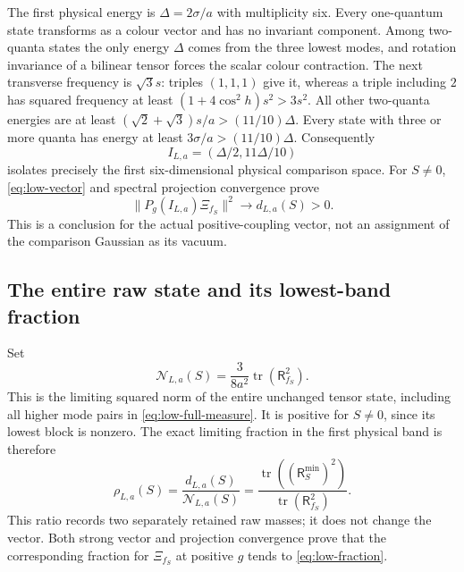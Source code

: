 The first physical energy is $\Delta=2\sigma/a$ with multiplicity six.
Every one-quantum state transforms as a colour vector and has no
invariant component. Among two-quanta states the only energy $\Delta$
comes from the three lowest modes, and rotation invariance of a
bilinear tensor forces the scalar colour contraction.
The next transverse frequency is $\sqrt3s$: triples $(1,1,1)$
give it, whereas a triple including $2$ has squared frequency at least
$(1+4\cos^2h)s^2>3s^2$.
All other two-quanta energies are at least
$(\sqrt2+\sqrt3)s/a>(11/10)\Delta$.
Every state with three or more quanta has energy at least
$3\sigma/a>(11/10)\Delta$.
Consequently
\[
 I_{L,a}=(\Delta/2,11\Delta/10)
\]
isolates precisely the first six-dimensional physical comparison space.
For $S\ne0$, \eqref{eq:low-vector} and spectral projection convergence
prove
\begin{equation}\label{eq:low-positive-g}
 \|P_g(I_{L,a})\Xi_{f_S}\|^2\longrightarrow d_{L,a}(S)>0.
\end{equation}
This is a conclusion for the actual positive-coupling vector, not
an assignment of the comparison Gaussian as its vacuum.

\subsection{The entire raw state and its lowest-band fraction}

Set
\[
 \mathcal N_{L,a}(S)=\frac3{8a^2}\operatorname{tr}(\mathsf R_{f_S}^2).
\]
This is the limiting squared norm of the entire unchanged tensor state,
including all higher mode pairs in \eqref{eq:low-full-measure}.
It is positive for $S\ne0$, since its lowest block is nonzero.
The exact limiting fraction in the first physical band is therefore
\begin{equation}\label{eq:low-fraction}
 \rho_{L,a}(S)=
 \frac{d_{L,a}(S)}{\mathcal N_{L,a}(S)}
 =\frac{\operatorname{tr}((\mathsf R_S^{\min})^2)}
        {\operatorname{tr}(\mathsf R_{f_S}^2)}.
\end{equation}
This ratio records two separately retained raw masses; it does not
change the vector. Both strong vector and projection convergence prove
that the corresponding fraction for $\Xi_{f_S}$ at positive $g$
tends to \eqref{eq:low-fraction}.

